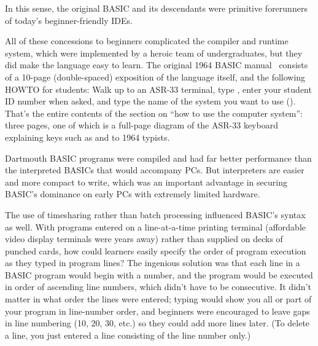 
In this sense, the original BASIC and its descendants were primitive
forerunners of today's beginner-friendly IDEs.

All of these concessions to beginners complicated the compiler and
runtime system, which were
implemented by a heroic team of undergraduates,
but they did make the language easy to learn.
The original 1964 BASIC manual~\cite[p. 14]{dartmouth_basic_manual}
consists of a 10-page (double-spaced) exposition of the language
itself, and the following HOWTO for students:
Walk up to an ASR-33 terminal, type , enter your student ID
number when asked, and type the name of the system you want to use
().
That's the entire contents of the section on ``how to use the computer
system'': three pages, one of which is a full-page diagram of the ASR-33
keyboard explaining keys such as  and  to 1964
typists.

\begin{tangent}
  Dartmouth BASIC programs were compiled and had
  far better performance than the interpreted BASICs that would
  accompany PCs. But interpreters are easier and more compact to write, which
  was an important advantage in securing BASIC's dominance on
  early PCs with extremely limited hardware.
\end{tangent}


The use of timesharing rather than batch processing influenced
BASIC's syntax as well.
With programs entered on a line-at-a-time printing terminal
(affordable video display
terminals were years away) rather than supplied on decks of punched
cards, how could learners easily specify the order of program execution
as they typed in program lines?
The ingenious solution was that each line in a BASIC
program would begin with a number, and the program would be
executed in order of ascending line numbers, which didn't have to be
consecutive.  
It didn't matter in what order the lines were entered;
typing  would show
you all or part of your program in line-number order,
and beginners were encouraged to leave gaps in line
numbering (10, 20, 30, etc.) so they could add
more lines later.  (To delete a line, you just entered a line
consisting of the line number only.)


